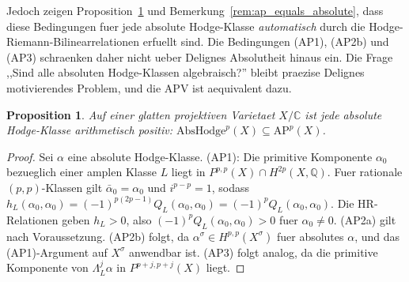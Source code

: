\documentclass[aps,prd,twocolumn,superscriptaddress,nofootinbib]{revtex4-2}
\newtheorem{proposition}[theorem]{Proposition}
\theoremstyle{definition}
\theoremstyle{remark}
\begin{document}
Jedoch zeigen Proposition~\ref{prop:absolute_implies_ap} und Bemerkung~\ref{rem:ap_equals_absolute}, dass diese Bedingungen fuer jede absolute Hodge-Klasse \textit{automatisch} durch die Hodge-Riemann-Bilinearrelationen erfuellt sind. Die Bedingungen (AP1), (AP2b) und (AP3) schraenken daher nicht ueber Delignes Absolutheit hinaus ein. Die Frage ,,Sind alle absoluten Hodge-Klassen algebraisch?'' bleibt praezise Delignes motivierendes Problem, und die APV ist aequivalent dazu.

\begin{proposition}
\label{prop:absolute_implies_ap}
Auf einer glatten projektiven Varietaet $X/\mathbb{C}$ ist jede absolute Hodge-Klasse arithmetisch positiv:
$\mathrm{AbsHodge}^p(X) \subseteq \mathrm{AP}^p(X)$.
\end{proposition}

\begin{proof}
Sei $\alpha$ eine absolute Hodge-Klasse. (AP1): Die primitive Komponente $\alpha_0$ bezueglich einer amplen Klasse $L$ liegt in $P^{p,p}(X) \cap H^{2p}(X, \mathbb{Q})$. Fuer rationale $(p,p)$-Klassen gilt $\bar{\alpha}_0 = \alpha_0$ und $i^{p-p} = 1$, sodass $h_L(\alpha_0, \alpha_0) = (-1)^{p(2p-1)} Q_L(\alpha_0, \alpha_0) = (-1)^p Q_L(\alpha_0, \alpha_0)$. Die HR-Relationen geben $h_L > 0$, also $(-1)^p Q_L(\alpha_0, \alpha_0) > 0$ fuer $\alpha_0 \neq 0$. (AP2a) gilt nach Voraussetzung. (AP2b) folgt, da $\alpha^\sigma \in H^{p,p}(X^\sigma)$ fuer absolutes $\alpha$, und das (AP1)-Argument auf $X^\sigma$ anwendbar ist. (AP3) folgt analog, da die primitive Komponente von $\Lambda_L^j \alpha$ in $P^{p+j,p+j}(X)$ liegt.
\end{proof}
\end{document}
